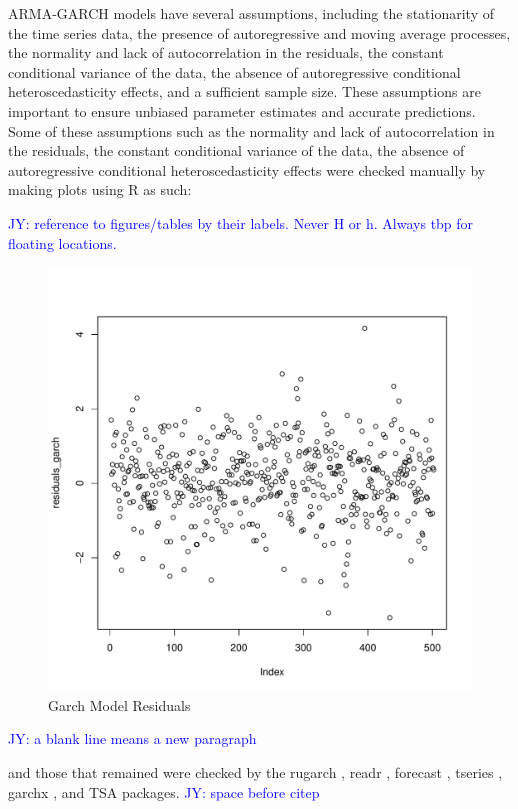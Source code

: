 \documentclass[12pt, letterpaper, titlepage]{article}
\newcommand{\jy}[1]{\textcolor{blue}{JY: #1}}
\begin{document}
ARMA-GARCH models have several assumptions, including the stationarity of the time series data, the presence of autoregressive and moving average processes, the normality and lack of autocorrelation in the residuals, the constant conditional variance of the data, the absence of autoregressive conditional heteroscedasticity effects, and a sufficient sample size. These assumptions are important to ensure unbiased parameter estimates and accurate predictions. Some of these assumptions such as the normality and lack of autocorrelation in the residuals, the constant conditional variance of the data, the absence of autoregressive conditional heteroscedasticity effects were checked manually by making plots using R as such:

\jy{reference to figures/tables by their labels. Never H or h. Always tbp for floating locations. }
\begin{figure}[!hb]
  \begin{center}
  \includegraphics[width=\textwidth]{../figures/fig4.pdf}
  \caption{Garch Model Residuals}\label{fig:fig1}
  \end{center}
\end{figure}

\jy{a blank line means a new paragraph}

and those that remained were checked by the rugarch \citep{rugarch}, readr \citep{readr}, forecast \citep{forecast}, tseries \citep{tseries}, garchx \citep{garchx}, and TSA \citep{TSA} packages.
\jy{space before citep}
\end{document}

